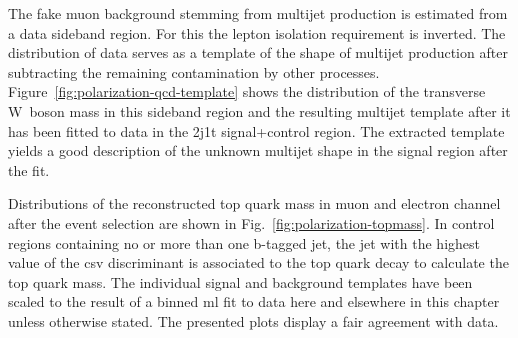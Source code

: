 The fake muon background stemming from multijet production is estimated from a data sideband region. For this the lepton isolation requirement is inverted. The distribution of data serves as a template of the shape of multijet production after subtracting the remaining contamination by other processes. Figure~\ref{fig:polarization-qcd-template} shows the distribution of the transverse W~boson mass in this sideband region and the resulting multijet template after it has been fitted to data in the 2j1t signal+control region. The extracted template yields a good description of the unknown multijet shape in the signal region after the fit.



Distributions of the reconstructed top quark mass in muon and electron channel after the event selection are shown in Fig.~\ref{fig:polarization-topmass}. In control regions containing no or more than one b-tagged jet, the jet with the highest value of the \gls{csv} discriminant is associated to the top quark decay to calculate the top quark mass. The individual signal and background templates have been scaled to the result of a binned \gls{ml} fit to data here and elsewhere in this chapter unless otherwise stated. The presented plots display a fair agreement with data.




